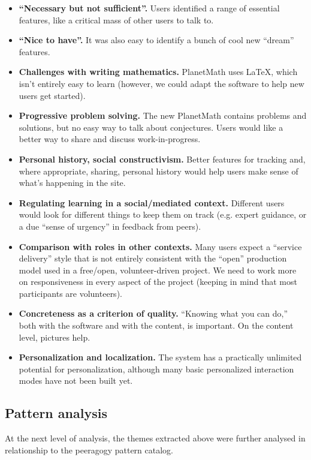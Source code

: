 \begin{itemize}
\item
  \textbf{``Necessary but not sufficient''.} Users identified a range of
  essential features, like a critical mass of other users to talk to.
\item
  \textbf{``Nice to have''.} It was also easy to identify a bunch of
  cool new ``dream'' features.
\item
  \textbf{Challenges with writing mathematics.} PlanetMath uses LaTeX,
  which isn't entirely easy to learn (however, we could adapt the
  software to help new users get started).
\item
  \textbf{Progressive problem solving.} The new PlanetMath contains
  problems and solutions, but no easy way to talk about conjectures.
  Users would like a better way to share and discuss work-in-progress.
\item
  \textbf{Personal history, social constructivism.} Better features for
  tracking and, where appropriate, sharing, personal history would help
  users make sense of what's happening in the site.
\item
  \textbf{Regulating learning in a social/mediated context.} Different
  users would look for different things to keep them on track (e.g.
  expert guidance, or a due ``sense of urgency'' in feedback from
  peers).
\item
  \textbf{Comparison with roles in other contexts.} Many users expect a
  ``service delivery'' style that is not entirely consistent with the
  ``open'' production model used in a free/open, volunteer-driven
  project. We need to work more on responsiveness in every aspect of the
  project (keeping in mind that most participants are volunteers).
\item
  \textbf{Concreteness as a criterion of quality.} ``Knowing what you
  can do,'' both with the software and with the content, is important.
  On the content level, pictures help.
\item
  \textbf{Personalization and localization.} The system has a
  practically unlimited potential for personalization, although many
  basic personalized interaction modes have not been built yet.
\end{itemize}
\subsection{Pattern analysis}

At the next level of analysis, the themes extracted above were further
analysed in relationship to the peeragogy pattern catalog.

